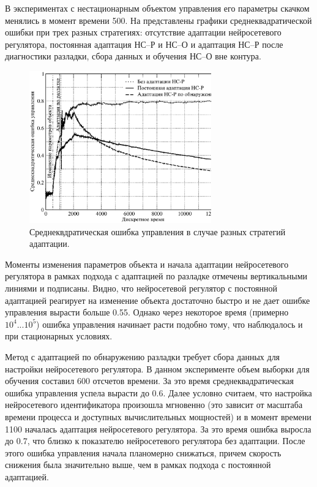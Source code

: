 
В экспериментах с нестационарным объектом управления его параметры
скачком менялись в момент времени 500.  На
 представлены графики
среднеквадратической ошибки при трех разных стратегиях: отсутствие
адаптации нейросетевого регулятора, постоянная адаптация НС--Р и НС--О и
адаптация НС--Р после диагностики разладки, сбора данных и обучения
НС--О вне контура.

\begin{figure}[h]
\centering
\includegraphics[width=0.7\textwidth,%
  height=0.3\textheight]{nonst_cmp_pa_ma_rus}
\caption{Среднеквдратическая ошибка управления в случае разных
  стратегий адаптации.}
\label{fig:nonst_cmp_pa_ma_rus}
\end{figure}

Моменты изменения параметров объекта и начала адаптации нейросетевого
регулятора в рамках подхода с адаптацией по разладке отмечены
вертикальными линиями и подписаны.  Видно, что нейросетевой регулятор
с постоянной адаптацией реагирует на изменение объекта достаточно
быстро и не дает ошибке управления вырасти больше 0.55.  Однако через
некоторое время (примерно $10^4...10^5$) ошибка управления начинает
расти подобно тому, что наблюдалось и при стационарных условиях.

Метод с адаптацией по обнаружению разладки требует сбора данных для
настройки нейросетевого регулятора.  В данном эксперименте объем
выборки для обучения составил 600 отсчетов времени.  За это время
среднеквадратическая ошибка управления успела вырасти до 0.6.  Далее
условно считаем, что настройка нейросетевого идентификатора произошла
мгновенно (это зависит от масштаба времени процесса и доступных
вычислительных мощностей) и в момент времени 1100 началась адаптация
нейросетевого регулятора.  За это время ошибка выросла до 0.7, что
близко к показателю нейросетевого регулятора без адаптации.  После
этого ошибка управления начала планомерно снижаться, причем скорость
снижения была значительно выше, чем в рамках подхода с постоянной
адаптацией.

